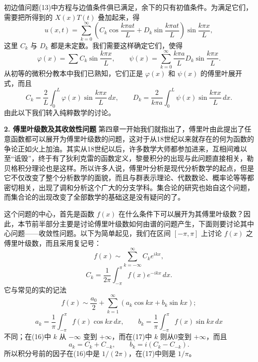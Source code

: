 初边值问题(13)中方程与边值条件俱已满足，余下的只有初值条件。为满足它们，需要把所得到的 $X(x)T(t)$ 叠加起来，得
\[
 u(x,t)=\sum_{k=0}^{\infty}\left(C_k\cos\frac{k\pi at}{L}+D_k\sin\frac{k\pi at}{L}\right)\sin\frac{k\pi x}{L},
\]
这里 $C_k$ 与 $D_k$ 都是未定数。我们需要这样确定它们，使得
\begin{equation}
 \varphi(x)=\sum C_k\sin\frac{k\pi x}{L},
 \qquad
 \psi(x)=\sum_{k=0}^{\infty}\frac{k\pi a}{L}D_k\sin\frac{k\pi x}{L}.
 \tag{15}
\end{equation}
从初等的微积分教本中我们已熟知，它们正是 $\varphi(x)$ 和 $\psi(x)$ 的傅里叶展开式，而且
\[
 C_k=\frac2L\int_0^L\varphi(x)\sin\frac{k\pi x}{L}\,dx,
\qquad
 D_k=\frac2{k\pi a}\int_0^L\psi(x)\sin\frac{k\pi x}{L}\,dx.
\]
由此以下我们转入纯粹数学的讨论。

\noindent\textbf{2. 傅里叶级数及其收敛性问题}\quad
第四章一开始我们就指出了，傅里叶由此提出了任意函数都可以展开为傅里叶级数的问题，这对于从18世纪以来就存在的何为函数的争论正如火上加油。其实从18世纪以后，许多数学大师都参加进来，互相间难以至“诋毁”，终于有了狄利克雷的函数定义，黎曼积分的出现与此问题直接相关，勒贝格积分理论也是这样。所以许多人说，傅里叶分析是现代分析数学的起点，但是它不仅改变了整个分析数学的面貌，而且与群表示理论、代数数论、概率论等等都密切相关，出现了调和分析这个广大的分支学科。集合论的研究也始自这个问题，而集合论的出现改变了全部数学的基础这是没有疑问的了。

这个问题的中心，首先是函数 $f(x)$ 在什么条件下可以展开为其傅里叶级数？因此，本节前半部分主要是讨论傅里叶级数如何由谱的问题产生，下面则要讨论其中心问题——收敛性问题。以下为简单起见，我们在区间 $[-\pi,\pi]$ 上讨论 $f(x)$ 之傅里叶级数，而且采用复记号：
\[
 f(x)\sim\sum_{k=-\infty}^{\infty}C_ke^{ikx},
\]
\begin{equation}
 C_k=\frac1{2\pi}\int_{-\pi}^{\pi}f(x)e^{-ikx}\,dx.
 \tag{16}
\end{equation}
它与常见的实的记法
\[
 f(x)\sim\frac{a_0}{2}+\sum_{k=1}^{\infty}(a_k\cos kx+b_k\sin kx);
\]
\begin{equation}
 a_k=\frac1\pi\int_{-\pi}^{\pi}f(x)\cos kx\,dx,
 \qquad
 b_k=\frac1\pi\int_{-\pi}^{\pi}f(x)\sin kx\,dx
 \tag{17}
\end{equation}
不同；在(16)中 $k$ 从 $-\infty$ 变到 $+\infty$，而在(17)中 $k$ 则从0变到 $+\infty$，而且
\begin{equation}
 a_k=C_k+C_{-k},\qquad b_k=i(C_k-C_{-k}).
 \tag{18}
\end{equation}
所以积分号前的因子在(16)中是 $1/(2\pi)$，在(17)中则是 $1/\pi$。

